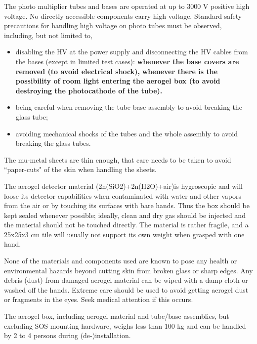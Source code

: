 \begin{obsolete}
The photo multiplier tubes and bases are operated at up to 3000 V
positive high voltage. No directly accessible components carry high
voltage. Standard safety precautions for handling high voltage on
photo tubes must be observed, including, but not limited to,
\begin{itemize}
\item{disabling the HV at the power supply and disconnecting the HV
cables from the bases (except in limited test cases):
{\bf whenever the base covers are removed (to avoid electrical shock),}
{\bf whenever there is the possibility of room light entering the
aerogel box (to avoid destroying the photocathode of the tube).}}
\item{being careful when removing the tube-base assembly to avoid breaking
the glass tube;}
\item{avoiding mechanical shocks of the tubes and the whole assembly to
avoid breaking the glass tubes.}
\end{itemize}

The mu-metal sheets are thin enough, that care needs to be taken to
avoid ``paper-cuts" of the skin when handling the sheets.

The aerogel detector material (2n(SiO2)+2n(H2O)+air)is hygroscopic
and will loose its detector capabilities when contaminated with water
and other vapors from the air or by touching its surfaces with bare
hands. Thus the box should be kept sealed whenever possible; ideally,
clean and dry gas should be injected and the material should not be
touched directly. The material is rather fragile, and a 25x25x3 cm
tile will usually not support its own weight when grasped with one
hand. 

None of the materials and components used are known to pose any
health or environmental hazards beyond cutting skin from broken glass
or sharp edges.  Any debris (dust) from damaged aerogel material can be wiped
with a damp cloth or washed off the hands.  Extreme care should be
used to avoid getting aerogel dust or fragments in the eyes.  Seek
medical attention if this occurs.

The aerogel box, including aerogel material and tube/base assemblies,
but excluding SOS mounting hardware, weighs less than 100 kg and
can be handled by 2 to 4 persons during (de-)installation.

\end{obsolete}
